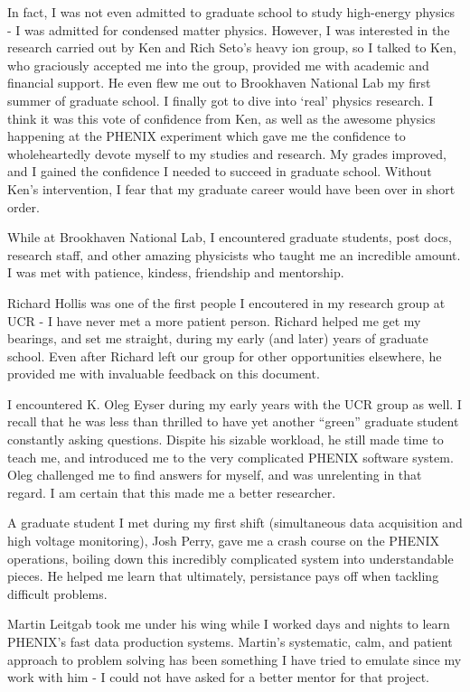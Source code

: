 In fact, I was not even admitted to graduate school to study high-energy physics
- I was admitted for condensed matter physics. However, I was interested in the
research carried out by Ken and Rich Seto's heavy ion group, so I talked to Ken,
who graciously accepted me into the group, provided me with academic and
financial support. He even flew me out to Brookhaven National Lab my first
summer of graduate school. I finally got to dive into `real' physics research.
I think it was this vote of confidence from Ken, as well as the awesome physics
happening at the PHENIX experiment which gave me the confidence to
wholeheartedly devote myself to my studies and research.  My grades improved,
and I gained the confidence I needed to succeed in graduate school.  Without
Ken's intervention, I fear that my graduate career would have been over in short
order.

While at Brookhaven National Lab, I encountered graduate students, post docs,
research staff, and other amazing physicists who taught me an incredible
amount. I was met with patience, kindess, friendship and mentorship.

Richard Hollis was one of the first people I encoutered in my research group at
UCR - I have never met a more patient person. Richard helped me get my bearings,
and set me straight, during my early (and later) years of graduate school. Even
after Richard left our group for other opportunities elsewhere, he provided me
with invaluable feedback on this document.  

I encountered K. Oleg Eyser during my early years with the UCR group as well. I
recall that he was less than thrilled to have yet another ``green'' graduate
student constantly asking questions. Dispite his sizable workload, he still made
time to teach me, and introduced me to the very complicated PHENIX software
system.  Oleg challenged me to find answers for myself, and was unrelenting in
that regard. I am certain that this made me a better researcher.

A graduate student I met during my first shift (simultaneous data acquisition
and high voltage monitoring), Josh Perry, gave me a crash course on the PHENIX
operations, boiling down this incredibly complicated system into understandable
pieces. He helped me learn that ultimately, persistance pays off when tackling
difficult problems.  

Martin Leitgab took me under his wing while I worked days and nights to learn
PHENIX's fast data production systems.  Martin's systematic, calm, and patient
approach to problem solving has been something I have tried to emulate since my
work with him - I could not have asked for a better mentor for that project. 

